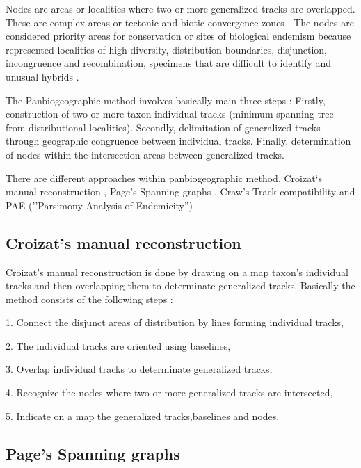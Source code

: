 Nodes are areas or localities where two or more generalized tracks are
overlapped. These are complex areas or tectonic and biotic convergence zones
\citep{Craw1988b, CrisciMorrone1992a, Morrone2004c, Page1987}. The nodes are
considered priority areas for conservation or sites of biological endemism
because represented localities of high diversity, distribution boundaries,
disjunction, incongruence and recombination, specimens that are difficult to
identify and unusual hybrids \citep{Crawetal1999, MorroneEspinosa1998,
Grehan1993}.


The Panbiogeographic method involves basically main three steps
\citep{Morrone2004c}: Firstly, construction of two or more taxon individual
tracks (minimum spanning tree from distributional localities). Secondly,
delimitation of generalized tracks through geographic congruence between
individual tracks. Finally, determination of nodes within the intersection areas
between generalized tracks.

There are different approaches within panbiogeographic method. Croizat`s manual
reconstruction \citep{Croizat1958, Croizat1964}, Page's Spanning graphs
\citep{Page1987}, Craw's Track compatibility \citep{Craw1989a} and PAE
(''Parsimony Analysis of Endemicity'') \citep{Rosen1984, Crawetal1999,
Luna-vegaetal2000, MorroneMarquez2001}



\subsection{Croizat's manual reconstruction}

Croizat's manual reconstruction is done by drawing on a map taxon's individual
tracks and then overlapping them to determinate generalized tracks. Basically
the method consists of the following steps \citep{Morrone2004c}:

1. Connect the disjunct areas of distribution by lines forming individual tracks,

2. The individual tracks are oriented using baselines,

3. Overlap individual tracks to determinate generalized tracks,

4. Recognize the nodes where two or more generalized tracks are intersected,

5. Indicate on a map the generalized tracks,baselines and nodes.


\subsection{Page's Spanning graphs}

